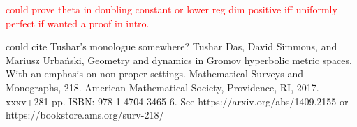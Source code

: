 \textcolor{red}{could prove theta in doubling constant or lower reg dim positive iff uniformly perfect if wanted a proof in intro.}




could cite Tushar's monologue somewhere? Tushar Das, David Simmons, and Mariusz Urbański, Geometry and dynamics in Gromov hyperbolic metric spaces. With an emphasis on non-proper settings. Mathematical Surveys and Monographs, 218. American Mathematical Society, Providence, RI, 2017. xxxv+281 pp. ISBN: 978-1-4704-3465-6. See https://arxiv.org/abs/1409.2155 or https://bookstore.ams.org/surv-218/
